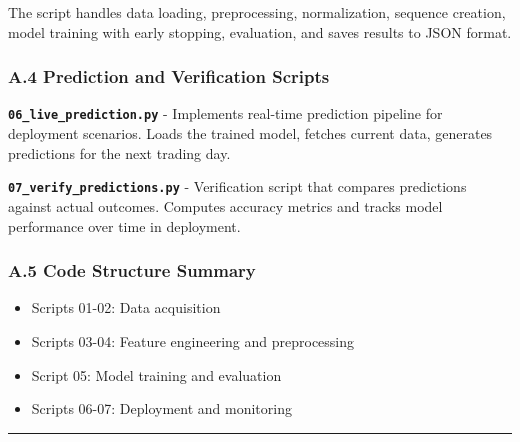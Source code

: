 \documentclass[
]{article}
\begin{document}
The script handles data loading, preprocessing, normalization, sequence
creation, model training with early stopping, evaluation, and saves
results to JSON format.

\subsubsection{A.4 Prediction and Verification
Scripts}\label{a4-prediction-and-verification-scripts}

\textbf{\texttt{06\_live\_prediction.py}} - Implements real-time
prediction pipeline for deployment scenarios. Loads the trained model,
fetches current data, generates predictions for the next trading day.

\textbf{\texttt{07\_verify\_predictions.py}} - Verification script that
compares predictions against actual outcomes. Computes accuracy metrics
and tracks model performance over time in deployment.

\subsubsection{A.5 Code Structure
Summary}\label{a5-code-structure-summary}

\begin{itemize}
\item
  Scripts 01-02: Data acquisition
\item
  Scripts 03-04: Feature engineering and preprocessing
\item
  Script 05: Model training and evaluation
\item
  Scripts 06-07: Deployment and monitoring
\end{itemize}

\begin{center}\rule{0.5\linewidth}{0.5pt}\end{center}
\end{document}
